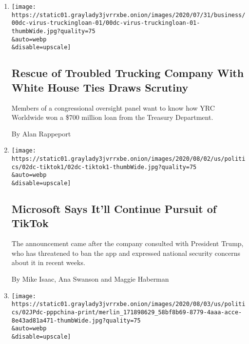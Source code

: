 \begin{enumerate}
\def\labelenumi{\arabic{enumi}.}
\item
  \href{/2020/08/03/us/politics/yrc-coronavirus-relief-funds.html}{}

  \texttt{[image: https://static01.graylady3jvrrxbe.onion/images/2020/07/31/business/00dc-virus-truckingloan-01/00dc-virus-truckingloan-01-thumbWide.jpg?quality=75\\\&auto=webp\\\&disable=upscale]}

  \hypertarget{rescue-of-troubled-trucking-company-with-white-house-ties-draws-scrutiny}{%
  \subsection{Rescue of Troubled Trucking Company With White House Ties
  Draws
  Scrutiny}\label{rescue-of-troubled-trucking-company-with-white-house-ties-draws-scrutiny}}

  Members of a congressional oversight panel want to know how YRC
  Worldwide won a \$700 million loan from the Treasury Department.

  By Alan Rappeport
\item
  \href{/2020/08/02/business/economy/trump-tiktok-china-national-security.html}{}

  \texttt{[image: https://static01.graylady3jvrrxbe.onion/images/2020/08/02/us/politics/02dc-tiktok1/02dc-tiktok1-thumbWide.jpg?quality=75\\\&auto=webp\\\&disable=upscale]}

  \hypertarget{microsoft-says-itll-continue-pursuit-of-tiktok}{%
  \subsection{Microsoft Says It'll Continue Pursuit of
  TikTok}\label{microsoft-says-itll-continue-pursuit-of-tiktok}}

  The announcement came after the company consulted with President
  Trump, who has threatened to ban the app and expressed national
  security concerns about it in recent weeks.

  By Mike Isaac, Ana Swanson and Maggie Haberman
\item
  \href{/2020/08/02/us/politics/virus-china-ppp-small-business-loans.html}{}

  \texttt{[image: https://static01.graylady3jvrrxbe.onion/images/2020/08/03/us/politics/02JPdc-pppchina-print/merlin\_171898629\_58bf8b69-8779-4aaa-acce-8e43ad81a471-thumbWide.jpg?quality=75\\\&auto=webp\\\&disable=upscale]}

  \hypertarget{us-small-business-bailout-money-flowed-to-chinese-owned-companies}{%
}
\end{enumerate}
